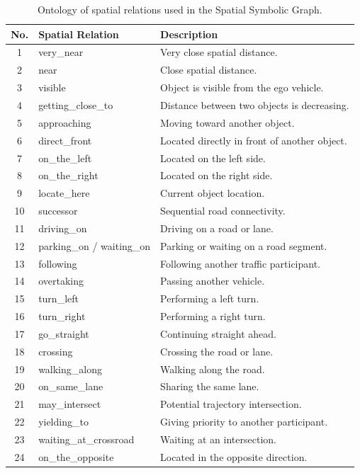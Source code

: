 \documentclass[a4paper, 11pt]{article} %
\begin{document}
\begin{table}[H]
\centering
\renewcommand{\arraystretch}{1.15}

\begin{tabularx}{\textwidth}{|c|>{\ttfamily}l|X|}
\hline
\textbf{No.} & \textbf{Spatial Relation} & \textbf{Description} \\
\hline
1 & very\_near & Very close spatial distance. \\ \hline
2 & near & Close spatial distance. \\ \hline
3 & visible & Object is visible from the ego vehicle. \\ \hline
4 & getting\_close\_to & Distance between two objects is decreasing. \\ \hline
5 & approaching & Moving toward another object. \\ \hline
6 & direct\_front & Located directly in front of another object. \\ \hline
7 & on\_the\_left & Located on the left side. \\ \hline
8 & on\_the\_right & Located on the right side. \\ \hline
9 & locate\_here & Current object location. \\ \hline
10 & successor & Sequential road connectivity. \\ \hline
11 & driving\_on & Driving on a road or lane. \\ \hline
12 & parking\_on / waiting\_on & Parking or waiting on a road segment. \\ \hline
13 & following & Following another traffic participant. \\ \hline
14 & overtaking & Passing another vehicle. \\ \hline
15 & turn\_left & Performing a left turn. \\ \hline
16 & turn\_right & Performing a right turn. \\ \hline
17 & go\_straight & Continuing straight ahead. \\ \hline
18 & crossing & Crossing the road or lane. \\ \hline
19 & walking\_along & Walking along the road. \\ \hline
20 & on\_same\_lane & Sharing the same lane. \\ \hline
21 & may\_intersect & Potential trajectory intersection. \\ \hline
22 & yielding\_to & Giving priority to another participant. \\ \hline
23 & waiting\_at\_crossroad & Waiting at an intersection. \\ \hline
24 & on\_the\_opposite & Located in the opposite direction. \\ \hline
\end{tabularx}

\caption{Ontology of spatial relations used in the Spatial Symbolic Graph.}
\label{tab:spatial_relation}
\end{table}
\end{document}
